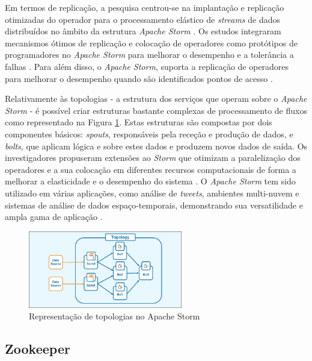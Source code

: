 Em termos de replicação, a pesquisa centrou-se na implantação e replicação otimizadas do 
operador para o processamento elástico de \textit{streams} de dados distribuídos no âmbito 
da estrutura \textit{Apache Storm} \cite{storm2017b}. Os estudos integraram mecanismos ótimos de
replicação e colocação de operadores como protótipos de programadores no \textit{Apache Storm} para
melhorar o desempenho e a tolerância a falhas \cite{storm2017c}. Para além disso, o 
\textit{Apache Storm}, suporta a replicação de operadores para melhorar o desempenho quando são 
identificados pontos de acesso \cite{storm2018c}.

Relativamente às topologias - a estrutura dos serviços que operam sobre o \textit{Apache Storm} - 
é possível criar estruturas bastante complexas de processamento de fluxos como representado na
Figura \ref{fig:topologies}. Estas estruturas são compostas por dois componentes básicos: 
\textit{spouts}, responsáveis pela receção e produção de dados, e \textit{bolts}, que aplicam 
lógica e sobre estes dados e produzem novos dados de saída. Os investigadores propuseram extensões 
ao \textit{Storm} que otimizam a paralelização dos operadores e a sua colocação em diferentes 
recursos computacionais de forma a melhorar a elasticidade e o desempenho do sistema 
\cite{storm2017d} . O \textit{Apache Storm} tem sido utilizado em várias aplicações, como análise 
de \textit{tweets}, ambientes multi-nuvem e sistemas de análise de dados espaço-temporais, 
demonstrando sua versatilidade e ampla gama de aplicação \cite{storm2018d} \cite{storm2020} 
\cite{storm2021}.

\begin{figure}[H]
    \centering
    \includegraphics[width=0.6\textwidth]{media/content/estado-arte/apache-storm-topology-diagram.png}
    \caption{Representação de topologias no Apache Storm}
    \label{fig:topologies}
\end{figure}

\subsection{Zookeeper}

